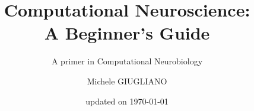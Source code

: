 \documentclass[graybox,envcountchap,sectrefs]{svmono}
\date{updated on \today}
\begin{document}
\author{Michele GIUGLIANO}
\title{Computational Neuroscience:\\ A Beginner's Guide}
\subtitle{A primer in Computational Neurobiology}
\maketitle

\frontmatter%






\tableofcontents



\mainmatter%
%

%
%
%
%
%
%

%


\backmatter%
%
%

%
\printindex

\end{document}
